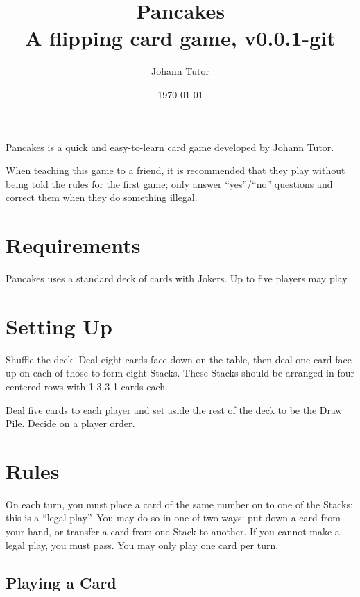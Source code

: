 \documentclass{article}
\newcommand\theversion{0.0.1-git}
\begin{document}
\title{Pancakes\\ \large A flipping card game, v\theversion}
\author{Johann Tutor}
\date{\today}
\maketitle

Pancakes is a quick and easy-to-learn card game developed by Johann Tutor.

When teaching this game to a friend, it is recommended that they play without being told the rules for the first game;
only answer ``yes''/``no'' questions and correct them when they do something illegal.

\tableofcontents

\newpage

\section{Requirements}

Pancakes uses a standard deck of cards with Jokers.
Up to five players may play.

\section{Setting Up}
\label{sec:setup}

Shuffle the deck. Deal eight cards face-down on the table, then deal one card face-up on each of those to form eight Stacks. These Stacks should be arranged in four centered rows with 1-3-3-1 cards each.

Deal five cards to each player and set aside the rest of the deck to be the Draw Pile. Decide on a player order.

\section{Rules}

On each turn, you must place a card of the same number on to one of the Stacks; this is a ``legal play''. You may do so in one of two ways: put down a card from your hand, or transfer a card from one Stack to another. If you cannot make a legal play, you must pass. You may only play one card per turn.

\subsection{Playing a Card}
\label{sec:playcard}
\end{document}
